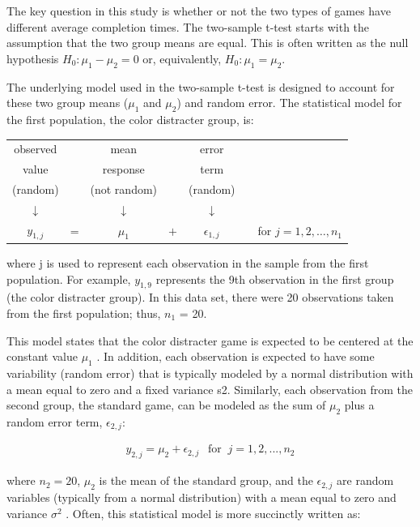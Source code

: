 \documentclass[
]{book}
\begin{document}
The key question in this study is whether or not the two types of games have different average completion times. The two-sample t-test starts with the assumption that the two group means are equal. This is often written as the null hypothesis \(H_0 : \mu_1 - \mu_2 = 0\) or, equivalently, \(H_0 : \mu_1 = \mu_2\).

The underlying model used in the two-sample t-test is designed to account for these two group means (\(\mu_1\) and \(\mu_2\)) and random error. The statistical model for the first population, the color distracter group, is:

\begin{table}[!h]
\centering
\begin{tabular}{ccccccc}
\toprule
observed &  & mean &  & error &  & \\
value &  & response &  & term &  & \\
(random) &  & (not random) &  & (random) &  & \\
$\downarrow$ &  & $\downarrow$ &  & $\downarrow$ &  & \\
$y_{1,j}$ & = & $\mu_1$ & $+$ & $\epsilon_{1,j}$ &  & for $j = 1, 2, \dots, n_1$\\
\bottomrule
\end{tabular}
\end{table}

where j is used to represent each observation in the sample from the first population. For example, \(y_{1, 9}\) represents the 9th observation in the first group (the color distracter group). In this data set, there were 20 observations taken from the first population; thus, \(n_1\) = 20.

This model states that the color distracter game is expected to be centered at the constant value \(\mu_1\) . In addition, each observation is expected to have some variability (random error) that is typically modeled by a normal distribution with a mean equal to zero and a fixed variance s2. Similarly, each observation from the second group, the standard game, can be modeled as the sum of \(\mu_2\) plus a random error term, \(\epsilon_{2, j}\):

\begin{align*}
y_{2, j} = \mu_2 + \epsilon_{2, j}  ~~\text{ for }~ j = 1, 2, ... ,n_2
\end{align*}

where \(n_2 = 20\), \(\mu_2\) is the mean of the standard group, and the \(\epsilon_{2, j}\) are random variables (typically from a normal distribution) with a mean equal to zero and variance \(\sigma^2\) . Often, this statistical model is more succinctly written as:
\end{document}
